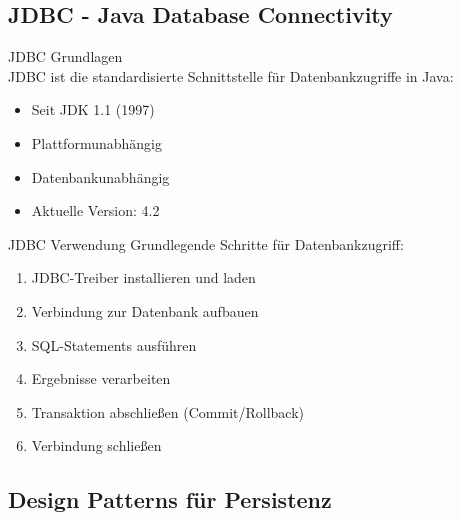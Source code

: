 \subsection{JDBC - Java Database Connectivity}

\begin{concept}{JDBC Grundlagen}\\
JDBC ist die standardisierte Schnittstelle für Datenbankzugriffe in Java:
\begin{itemize}
    \item Seit JDK 1.1 (1997)
    \item Plattformunabhängig
    \item Datenbankunabhängig
    \item Aktuelle Version: 4.2
\end{itemize}
\end{concept}

\begin{KR}{JDBC Verwendung}
Grundlegende Schritte für Datenbankzugriff:
\begin{enumerate}
    \item JDBC-Treiber installieren und laden
    \item Verbindung zur Datenbank aufbauen
    \item SQL-Statements ausführen
    \item Ergebnisse verarbeiten
    \item Transaktion abschließen (Commit/Rollback)
    \item Verbindung schließen
\end{enumerate}
\end{KR}



\subsection{Design Patterns für Persistenz}

